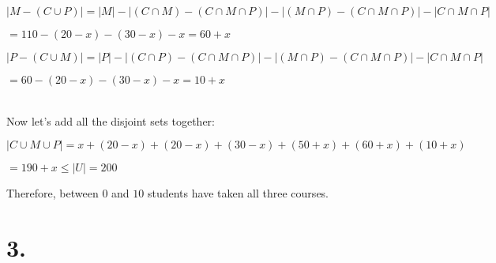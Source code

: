 \documentclass{article}
\newenvironment{Solution}
{\noindent\color{red}}
{\newline}
\begin{document}
\begin{Solution}
\begin{adjustwidth}{2em}{0em}
\begin{adjustwidth}{2em}{0em}
            $|M - (C \cup P)| = |M| - |(C \cap M) - (C \cap M \cap P)| - |(M \cap P)- (C \cap M \cap P)| - |C \cap M \cap P|$

            \hspace*{6.585em}$ = 110 - (20 - x) - (30 - x) - x = 60 + x$

            $|P - (C \cup M)| = |P| - |(C \cap P) - (C \cap M \cap P)| - |(M \cap P)- (C \cap M \cap P)| - |C \cap M \cap P|$

            \hspace*{6.585em}$ = 60 - (20 - x) - (30 - x) - x = 10 + x$
        \end{adjustwidth}
    \end{adjustwidth}

    \ \\

    Now let's add all the disjoint sets together:

    $|C \cup M \cup P| = x + (20 - x) + (20 - x) + (30 - x) + (50 + x) + (60 + x) + (10 + x)$

    \phantom{ }

    \hspace*{5.71em}$= 190 + x \leq |U| = 200$

    \phantom{ }

    Therefore, between $0$ and $10$ students have taken all three courses. 
\end{Solution}







\vspace*{5em}




\section*{3. }
\end{document}
